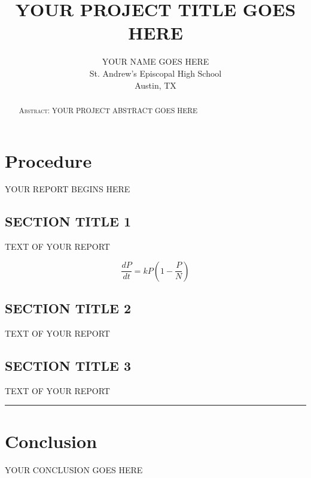\documentclass[10pt,final]{article}
\begin{document}

\title{YOUR PROJECT TITLE GOES HERE}
\author{YOUR NAME GOES HERE
\\
St. Andrew's Episcopal High School\\
Austin, TX
}

\maketitle

\begin{abstract}
\textsc{Abstract:} YOUR PROJECT ABSTRACT GOES HERE
\end{abstract}


\section*{Procedure}

\begin{multicols}{2}

YOUR REPORT BEGINS HERE

\subsection*{SECTION TITLE 1}

TEXT OF YOUR REPORT

\[
    \displaystyle\frac{dP}{dt}= kP\left(1-\displaystyle\frac{P}{N}\right)
\]

\subsection*{SECTION TITLE 2}

TEXT OF YOUR REPORT


\subsection*{SECTION TITLE 3}

TEXT OF YOUR REPORT

\end{multicols}

\hrule

\section*{Conclusion}

YOUR CONCLUSION GOES HERE
\end{document}
